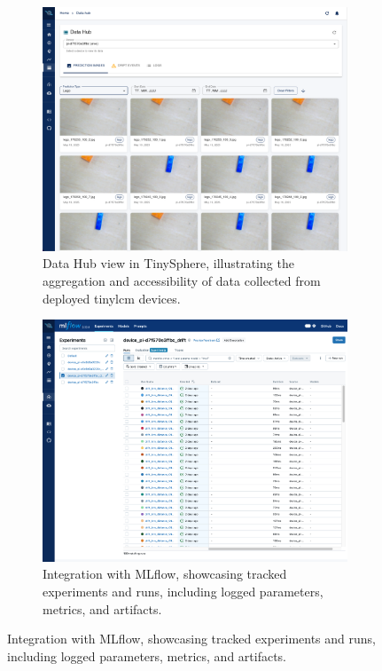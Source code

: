 \begin{figure}[htbp]
    \vspace{1em}

    \begin{subfigure}[b]{0.48\textwidth}
        \centering
        \includegraphics[width=\textwidth]{figs/framework/data-hub-page.png}
        \caption{Data Hub view in TinySphere, illustrating the aggregation and accessibility of data collected from deployed \gls{tinylcm} devices.}
        \label{fig:ui_data_hub}
    \end{subfigure}
    \hfill
    \begin{subfigure}[b]{0.48\textwidth}
        \centering
        \includegraphics[width=\textwidth]{figs/framework/mlflow-page.png}
        \caption{Integration with MLflow, showcasing tracked experiments and runs, including logged parameters, metrics, and artifacts.}
        \label{fig:ui_mlflow_integration}
    \end{subfigure}


\end{figure}

